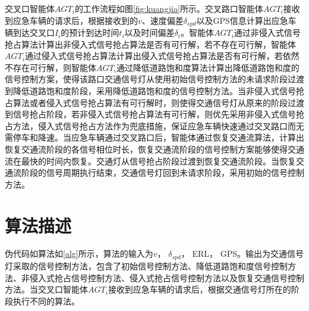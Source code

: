 
交叉口智能体${AGT_i}$的工作流程如图\ref{fig:kuangjia}所示。交叉路口智能体${AGT_i}$接收到应急车辆的请求后，根据接收到的${v}$、速度偏差${\delta_{spd}}$以及GPS信息计算出应急车辆到达交叉口${I_i}$的预计到达时间${t_i}$以及时间偏差${\delta_{i}}$。智能体${AGT_i}$通过非侵入式信号抢占算法计算出非侵入式信号抢占算法是否有可行解，若不存在可行解，智能体${AGT_i}$通过侵入式信号抢占算法计算出侵入式信号抢占算法是否有可行解，若依然不存在可行解，则智能体${AGT_i}$通过降低道路饱和度算法计算出降低道路饱和度的信号控制方案，使得该路口交通信号灯从使用初始信号控制方法的未请求阶段过渡到降低道路饱和度阶段，采用降低道路饱和度的信号控制方法。当非侵入式信号抢占算法或者侵入式信号抢占算法有可行解时，则使得交通信号灯从原来的阶段过渡到信号抢占阶段，若非侵入式信号抢占算法有可行解，则优先采用非侵入式信号抢占方法，侵入式信号抢占方法作为兜底措施，保证应急车辆快速通过交叉路口而无需停车和降速。当应急车辆通过交叉路口后，智能体通过恢复交通流算法，计算出恢复交通流阶段的各信号相位时长，恢复交通流阶段的信号控制方案能够使得交通流在最快的时间内恢复。交通灯从信号抢占阶段过渡到恢复交通流阶段。当恢复交通流阶段的信号周期执行结束，交通信号灯回到未请求阶段，采用初始的信号控制方法。



\section{算法描述}
伪代码如算法如\ref{alg}所示，算法的输入为${v}$， ${\delta_{spd}}$， ERL， GPS。输出为交通信号灯采取的信号控制方法，包含了初始信号控制方法、降低道路饱和度信号控制方法、非侵入式抢占信号控制方法、侵入式抢占信号控制方法以及恢复交通信号控制方法。当交叉口智能体${AGT_i}$接收到应急车辆的请求后，根据交通信号灯所在的阶段执行不同的算法。

